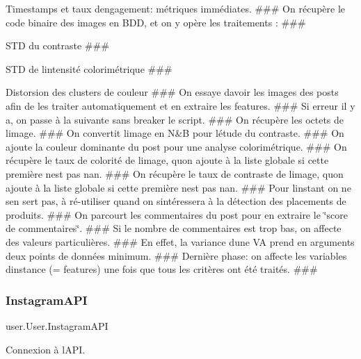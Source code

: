 Timestamps et taux d\textquotesingle{}engagement\+: métriques immédiates. \#\#\# On récupère le code binaire des images en B\+DD, et on y opère les traitements \+: \#\#\#
\begin{DoxyItemize}
\item S\+TD du contraste \#\#\#
\item S\+TD de l\textquotesingle{}intensité colorimétrique \#\#\#
\item Distorsion des clusters de couleur \#\#\# On essaye d\textquotesingle{}avoir les images des posts afin de les traiter automatiquement et en extraire les features. \#\#\# Si erreur il y a, on passe à la suivante sans breaker le script. \#\#\# On récupère les octets de l\textquotesingle{}image. \#\#\# On convertit l\textquotesingle{}image en N\&B pour l\textquotesingle{}étude du contraste. \#\#\# On ajoute la couleur dominante du post pour une analyse colorimétrique. \#\#\# On récupère le taux de colorité de l\textquotesingle{}image, qu\textquotesingle{}on ajoute à la liste globale si cette première n\textquotesingle{}est pas nan. \#\#\# On récupère le taux de contraste de l\textquotesingle{}image, qu\textquotesingle{}on ajoute à la liste globale si cette première n\textquotesingle{}est pas nan. \#\#\# Pour l\textquotesingle{}instant on ne s\textquotesingle{}en sert pas, à ré-\/utiliser quand on s\textquotesingle{}intéressera à la détection des placements de produits. \#\#\# On parcourt les commentaires du post pour en extraire le \char`\"{}score de commentaires\char`\"{}. \#\#\# Si le nombre de commentaires est trop bas, on affecte des valeurs particulières. \#\#\# En effet, la variance d\textquotesingle{}une VA prend en arguments deux points de données minimum. \#\#\# Dernière phase\+: on affecte les variables d\textquotesingle{}instance (= features) une fois que tous les critères ont été traités. \#\#\# 
\end{DoxyItemize}\mbox{\label{classuser_1_1_user_a6bd90421024505f3be18cab7f2b56dd8}} 
\subsubsection{\texorpdfstring{Instagram\+A\+PI}{InstagramAPI}}
{\footnotesize\ttfamily user.\+User.\+Instagram\+A\+PI}



Connexion à l\textquotesingle{}A\+PI. 

